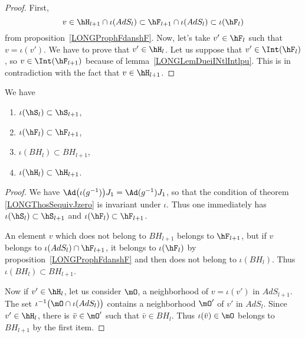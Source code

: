 \begin{proof}
    First,
    \begin{equation}
        v\in\hH_{l+1}\cap\iota(AdS_l)\subset\hF_{l+1}\cap\iota(AdS_l)\subset\iota(\hF_l)
    \end{equation}
    from proposition~\ref{LONGProphFdanshF}. Now, let's take $v'\in\hF_l$ such that $v=\iota(v')$. We have to prove that $v'\in\hH_l$. Let us suppose that $v'\in\Int(\hF_l)$, so $v\in\Int(\hF_{l+1})$ because of lemma~\ref{LONGLemDueiINtlIntlpu}. This is in contradiction with the fact that $v\in\hH_{l+1}$.
\end{proof}

\begin{corollary}        \label{LONGCorDeuxTrucsBHhH}
    We have
    \begin{multicols}{2}
        \begin{enumerate}

        \item
            $\iota(\hS_l)\subset\hS_{l+1}$,
        \item
            $\iota(\hF_l)\subset\hF_{l+1}$,
        \item
            $\iota(BH_l)\subset BH_{l+1}$,
        \item
            $\iota(\hH_l)\subset \hH_{l+1}$.

        \end{enumerate}
    \end{multicols}
\end{corollary}

\begin{proof}
    We have $\Ad\big( \iota(g^{-1}) \big)J_1=\Ad(g^{-1})J_1$, so that the condition of theorem \eqref{LONGThosSequivJzero} is invariant under $\iota$. Thus one immediately has $\iota(\hS_l)\subset\hS_{l+1}$ and $\iota(\hF_l)\subset\hF_{l+1}$.

    An element $v$ which does not belong to $BH_{l+1}$ belongs to $\hF_{l+1}$, but if $v$ belongs to $\iota(AdS_l)\cap\hF_{l+1}$, it belongs to $\iota(\hF_l)$ by proposition~\ref{LONGProphFdanshF} and then does not belong to $\iota(BH_l)$. Thus $\iota(BH_{l})\subset BH_{l+1}$.

    Now if $v'\in\hH_l$, let us consider $\mO$, a neighborhood of $v=\iota(v')$ in $AdS_{l+1}$. The set $\iota^{-1}\big( \mO\cap\iota(AdS_l) \big)$ contains a neighborhood $\mO'$ of $v'$ in $AdS_{l}$. Since $v'\in\hH_l$, there is $\bar v\in\mO'$ such that $\bar v\in BH_l$. Thus $\iota(\bar v)\in\mO$ belongs to $BH_{l+1}$ by the first item.

\end{proof}

